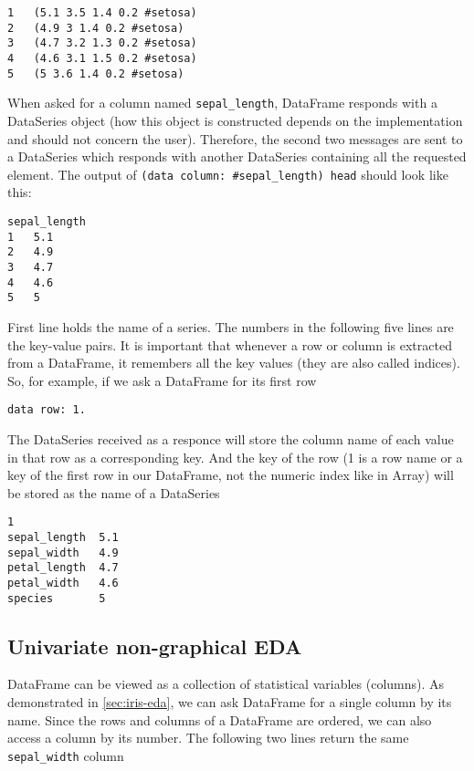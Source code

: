 \documentclass[sigplan]{acmart}
\begin{document}
\begin{lstlisting}[basicstyle=\small,language=Smalltalk]
1   (5.1 3.5 1.4 0.2 #setosa)
2   (4.9 3 1.4 0.2 #setosa)
3   (4.7 3.2 1.3 0.2 #setosa)
4   (4.6 3.1 1.5 0.2 #setosa)
5   (5 3.6 1.4 0.2 #setosa)
\end{lstlisting}

When asked for a column named \texttt{sepal\_length}, DataFrame responds with a DataSeries object (how this object is constructed depends on the implementation and should not concern the user). Therefore, the second two messages are sent to a DataSeries which responds with another DataSeries containing all the requested element. The output of \texttt{(data column: \#sepal\_length) head} should look like this:

\begin{lstlisting}[basicstyle=\small,language=Smalltalk]
sepal_length
1   5.1
2   4.9
3   4.7
4   4.6
5   5
\end{lstlisting}

First line holds the name of a series. The numbers in the following five lines are the key-value pairs. It is important that whenever a row or column is extracted from a DataFrame, it remembers all the key values (they are also called indices). So, for example, if we ask a DataFrame for its first row

\begin{lstlisting}[basicstyle=\small,language=Smalltalk]
data row: 1.
\end{lstlisting}

The DataSeries received as a responce will store the column name of each value in that row as a corresponding key. And the key of the row (1 is a row name or a key of the first row in our DataFrame, not the numeric index like in Array) will be stored as the name of a DataSeries

\begin{lstlisting}[basicstyle=\small,language=Smalltalk]
1
sepal_length  5.1
sepal_width   4.9
petal_length  4.7 
petal_width   4.6
species       5 
\end{lstlisting}

\subsection{Univariate non-graphical EDA}
\label{sec:uni-non}

DataFrame can be viewed as a collection of statistical variables (columns). As demonstrated in \ref{sec:iris-eda}, we can ask DataFrame for a single column by its name. Since the rows and columns of a DataFrame are ordered, we can also access a column by its number. The following two lines return the same \texttt{sepal\_width} column
\end{document}
